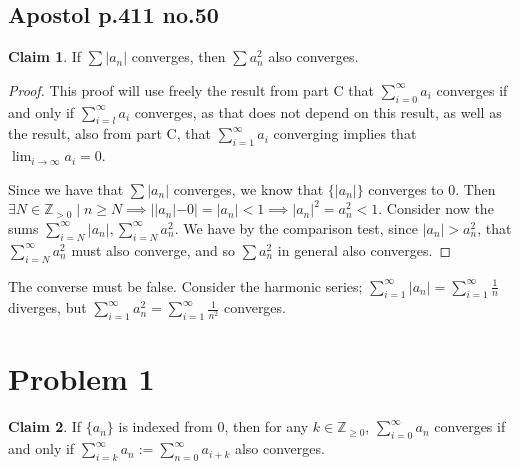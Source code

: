 \documentclass[12pt,letterpaper]{article}
\theoremstyle{definition}
\newtheorem*{claim}{Claim}
\newcommand{\Ze}{\mathbb{Z}_{\geq 0}}
\newcommand{\Zg}{\mathbb{Z}_{>0}}
\begin{document}
\subsection*{Apostol p.411 no.50}

\begin{claim}
  If $\sum |a_n|$ converges, then $\sum a_n^2$ also converges.
\end{claim}

\begin{proof}
  This proof will use freely the result from part C that $\sum_{i=0}^\infty a_i$
  converges if and only if $\sum_{i=l}^\infty a_i$ converges, as that does not
  depend on this result, as well as the result, also from part C, that
  $\sum_{i=1}^\infty a_i$ converging implies that $\lim_{i\rightarrow \infty}a_i
  = 0$.

  Since we have that $\sum |a_n|$ converges, we know that $\{|a_n|\}$ converges
  to 0. Then $\exists N \in \Zg \mid n \geq N \implies ||a_n| - 0| = |a_n| < 1
  \implies |a_n|^2 = a_n^2 < 1$. Consider now the sums $\sum_{i=N}^\infty|a_n|,
  \sum_{i=N}^\infty a_n^2$. We have by the comparison test, since $|a_n| >
  a_n^2$, that $\sum_{i=N}^\infty a_n^2$ must also converge, and so $\sum a_n^2$
  in general also converges.
\end{proof}

The converse must be false. Consider the harmonic series; $\sum_{i=1}^\infty |a_n| = \sum_{i=1}^\infty
\frac{1}{n}$ diverges, but $\sum_{i=1}^\infty a_n^2 = \sum_{i=1}^\infty \frac{1}{n^2}$ converges.

\section*{Problem 1}

\begin{claim}
  If $\{a_n\}$ is indexed from 0, then for any $k \in \Ze$,
  $\sum_{i=0}^\infty a_n$ converges if and only if $\sum_{i=k}^\infty a_n :=
  \sum_{n=0}^\infty a_{i+k}$ also converges.
\end{claim}
\end{document}
